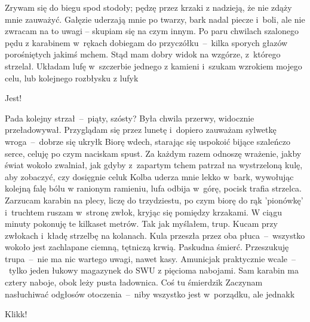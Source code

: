\documentclass[../MAIN.tex]{subfiles}
\begin{document}
Zrywam się do biegu spod stodoły; pędzę przez krzaki z
nadzieją, że nie zdąży mnie zauważyć. Gałęzie uderzają mnie po
twarzy, bark nadal piecze i~boli, ale nie zwracam na to uwagi –
skupiam się na czym innym. Po paru chwilach szalonego pędu z
karabinem w~rękach dobiegam do przyczółku~--~kilka sporych
głazów porośniętych jakimś mchem. Stąd mam dobry widok na
wzgórze, z~którego strzelał. Układam lufę w~szczerbie jednego z
kamieni i~szukam wzrokiem mojego celu, lub kolejnego rozbłysku
z lufy\3k

Jest!

Pada kolejny strzał~--~piąty, szósty? Była chwila przerwy,
widocznie przeładowywał. Przyglądam się przez lunetę i~dopiero
zauważam sylwetkę wroga~--~dobrze się ukrył\3k Biorę wdech,
starając się uspokoić bijące szaleńczo serce, celuję po czym
naciskam spust. Za każdym razem odnoszę wrażenie, jakby świat
wokoło zwalniał, jak gdyby z~zapartym tchem patrzał na
wystrzeloną kulę, aby zobaczyć, czy dosięgnie celu\3k Kolba
uderza mnie lekko w~bark, wywołując kolejną falę bólu w
ranionym ramieniu, lufa odbija w~górę, pocisk trafia strzelca.
Zarzucam karabin na plecy, liczę do trzydziestu, po czym biorę
do rąk 'pionówkę' i~truchtem ruszam w~stronę zwłok, kryjąc się
pomiędzy krzakami. W ciągu minuty pokonuję te kilkaset metrów.
Tak jak myślałem, trup. Kucam przy zwłokach i~kładę strzelbę na
kolanach. Kula przeszła przez oba płuca~--~wszystko wokoło jest
zachlapane ciemną, tętniczą krwią. Paskudna śmierć. Przeszukuję
trupa~--~nie ma nic wartego uwagi, nawet kasy. Amunicja\3k
praktycznie wcale~--~tylko jeden łukowy magazynek do SWU z
pięcioma nabojami. Sam karabin ma cztery naboje, obok leży
pusta ładownica. Coś tu śmierdzi\3k Zaczynam nasłuchiwać
odgłosów otoczenia~--~niby wszystko jest w~porządku, ale
jednak\3k

Klik\3k!
\end{document}

